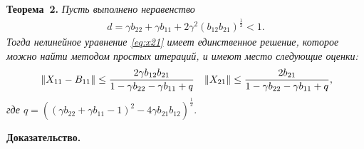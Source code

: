 \noindent\textbf{Теорема~2.}
{ \it Пусть выполнено неравенство
\begin{align}
d = \gamma b_{22} + \gamma b_{11} + 2\gamma^2 (b_{12}b_{21})^{\frac{1}{2}} < 1. \label{coef}
\end{align}
Тогда нелинейное уравнение \eqref{eq:x21} имеет единственное решение, которое можно найти методом простых итераций, и имеют место следующие оценки:
\begin{align*}
&\left\|X_{11} - B_{11}\right\| \leq \frac{2\gamma b_{12}b_{21}}{1 - \gamma b_{22} - \gamma b_{11} + q}
&\left\|X_{21}\right\| \leq \frac{2b_{21}}{1 - \gamma b_{22} - \gamma b_{11} + q},
\end{align*}
где $q = ((\gamma b_{22} + \gamma b_{11} - 1)^2 - 4\gamma b_{21}b_{12})^{\frac{1}{2}}.$}

\noindent\textbf{Доказательство.}

